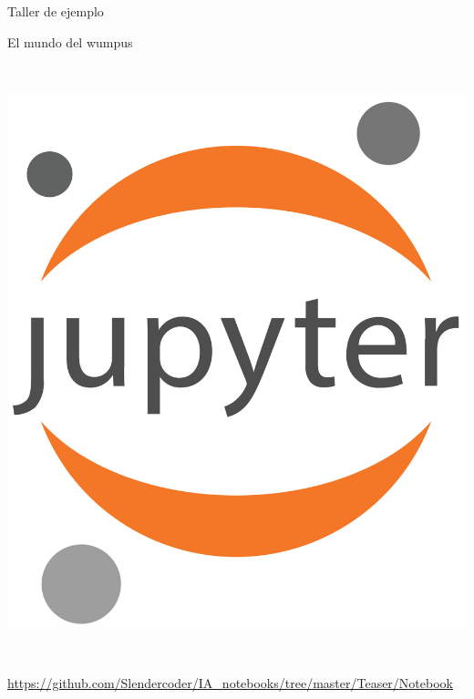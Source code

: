 \documentclass[11pt]{beamer}
\begin{document}
\begin{frame}{Taller de ejemplo}

\begin{center}
El mundo del wumpus

\

\includegraphics[scale=.05]{imagenes/Jupyter_logo}

\

\url{https://github.com/Slendercoder/IA_notebooks/tree/master/Teaser/Notebook}
\end{center}

\end{frame}
\end{document}

